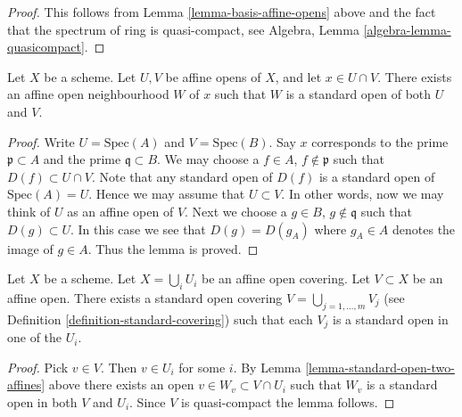 \begin{proof}
This follows from Lemma \ref{lemma-basis-affine-opens} above
and the fact that the spectrum of ring is quasi-compact, see
Algebra, Lemma \ref{algebra-lemma-quasicompact}.
\end{proof}

\begin{lemma}
\label{lemma-standard-open-two-affines}
Let $X$ be a scheme.
Let $U, V$ be affine opens of $X$, and let $x \in U \cap V$.
There exists an affine open neighbourhood $W$ of $x$
such that $W$ is a standard open of both $U$ and $V$.
\end{lemma}

\begin{proof}
Write $U = \text{Spec}(A)$ and $V = \text{Spec}(B)$.
Say $x$ corresponds to the prime $\mathfrak p \subset A$
and the prime $\mathfrak q \subset B$.
We may choose a $f \in A$, $f \not \in \mathfrak p$ such that
$D(f) \subset U \cap V$. Note that any standard open of $D(f)$
is a standard open of $\text{Spec}(A) = U$. Hence we may assume
that $U \subset V$. In other words, now we may think of $U$
as an affine open of $V$. Next we choose a
$g \in B$, $g \not \in \mathfrak q$ such that
$D(g) \subset U$. In this case we see that $D(g) = D(g_A)$
where $g_A \in A$ denotes the image of $g \in A$. Thus the lemma
is proved.
\end{proof}

\begin{lemma}
\label{lemma-good-subcover}
Let $X$ be a scheme.
Let $X = \bigcup_i U_i$ be an affine open covering.
Let $V \subset X$ be an affine open.
There exists a standard open covering
$V = \bigcup_{j = 1, \ldots, m} V_j$ (see
Definition \ref{definition-standard-covering})
such that each $V_j$ is a standard open in one of the $U_i$.
\end{lemma}

\begin{proof}
Pick $v \in V$. Then $v \in U_i$ for some $i$.
By Lemma \ref{lemma-standard-open-two-affines} above there exists an open
$v \in W_v \subset V \cap U_i$ such that
$W_v$ is a standard open in both $V$ and $U_i$.
Since $V$ is quasi-compact the lemma follows.
\end{proof}

